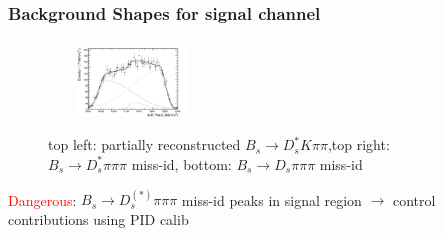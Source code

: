 \documentclass[]{beamer}
\begin{document}
\begin{frame}
\frametitle{Background Shapes for signal channel}


\begin{figure}
\includegraphics[width=4.5cm,height=2.0cm]{pics/Bs2DsstartKpipi.png}
\\
\caption{top left: partially reconstructed $B_{s}\rightarrow D_{s}^{*}K\pi\pi$,\newline top right: $B_{s}\rightarrow D_{s}^{*}\pi\pi\pi$ miss-id, bottom: $B_{s}\rightarrow D_{s}\pi\pi\pi$ miss-id}
\end{figure}

\small

\textcolor{red}{Dangerous}: $B_{s}\rightarrow D_{s}^{(*)}\pi\pi\pi$ miss-id peaks in signal region $\rightarrow$ control contributions using PID calib
  
\normalsize

\end{frame}
\end{document}
